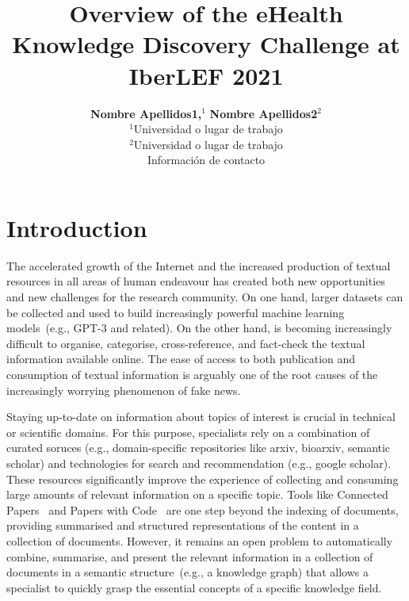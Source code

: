 \documentclass[a4paper,11pt,twocolumn,twoside]{article}
\title{Overview of the eHealth Knowledge Discovery Challenge at IberLEF 2021}
\author {\textbf{Nombre Apellidos1,$^1$} \textbf{Nombre Apellidos2$^2$}\\
$^1$Universidad o lugar de trabajo\\
$^2$Universidad o lugar de trabajo\\
Información de contacto\\
}
\begin{document}


\label{firstpage} \maketitle

%

\section{Introduction}


The accelerated growth of the Internet and the increased production of textual resources in all areas of human endeavour has created both new opportunities and new challenges for the research community.
On one hand, larger datasets can be collected and used to build increasingly powerful machine learning models~(e.g., GPT-3 and related).
On the other hand, is becoming increasingly difficult to organise, categorise, cross-reference, and fact-check the textual information available online.
The ease of access to both publication and consumption of textual information is arguably one of the root causes of the increasingly worrying phenomenon of fake news.

Staying up-to-date on information about topics of interest is crucial in technical or scientific domains.
For this purpose, specialists rely on a combination of curated soruces (e.g., domain-specific repositories like arxiv, bioarxiv, semantic scholar) and technologies for search and recommendation (e.g., google scholar).
These resources significantly improve the experience of collecting and consuming large amounts of relevant information on a specific topic.
Tools like Connected Papers~\cite{} and Papers with Code~\cite{} are one step beyond the indexing of documents, providing summarised and structured representations of the content in a collection of documents.
However, it remains an open problem to automatically combine, summarise, and present the relevant information in a collection of documents in a semantic structure~(e.g., a knowledge graph) that allows a specialist to quickly grasp the essential concepts of a specific knowledge field.
\end{document}
